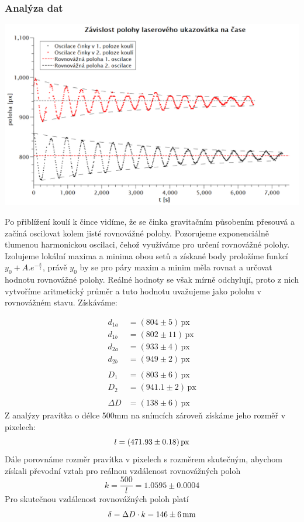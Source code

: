 \documentclass[czech,11pt,a4paper]{article}
\begin{document}
		\subsubsection{Analýza dat}
\begin{center}
			\includegraphics[width=0.89\linewidth]{Oscilace}
\end{center}
	Po přiblížení koulí k čince vidíme, že se činka gravitačním působením přesouvá a začíná oscilovat kolem jisté rovnovážné polohy. Pozorujeme exponenciálně tlumenou harmonickou oscilaci, čehož využíváme pro určení rovnovážné polohy. Izolujeme lokální maxima a minima obou setů a získané body proložíme funkcí $y_0 + A.e^{-\frac{x}{t}}$, právě $y_0$ by se pro páry maxim a minim měla rovnat a určovat hodnotu rovnovážné polohy. Reálné hodnoty se však mírně odchylují, proto z nich vytvoříme aritmetický průměr a tuto hodnotu uvažujeme jako polohu v rovnovážném stavu. Získáváme:
	
		\begin{align*}
		d_{1a} &= (804 \pm 5) \, \text{px}\\
		d_{1b} &= (802 \pm 11)\, \text{px} \\ 
		d_{2a} &= (933 \pm 4) \, \text{px} \\
		d_{2b} &= (949 \pm 2) \, \text{px} \\ \\
		D_1 &= (803 \pm 6) \, \text{px}\\
		D_2 &= (941.1 \pm 2) \, \text{px}\\ \\
		\Delta D &= (138 \pm 6) \,\text{px}
	\end{align*}
	Z analýzy pravítka o délce 500mm na snímcích zároveň získáme jeho rozměř v pixelech:
	\begin{equation*}
		l = (471.93 \pm 0.18) \,\rm px
	\end{equation*}
	Dále porovnáme rozměr pravítka v pixelech s rozměrem skutečným, abychom získali převodní vztah pro reálnou vzdálenost rovnovážných poloh
	\begin{equation*}
		k = \frac{500}{l} = 1.0595 \pm 0.0004
	\end{equation*}
	Pro skutečnou vzdálenost rovnovážných poloh platí
	\begin{equation*}
		\delta = \Delta D \cdot k = 146 \pm 6 \,\rm mm
	\end{equation*}
	
\end{document}
